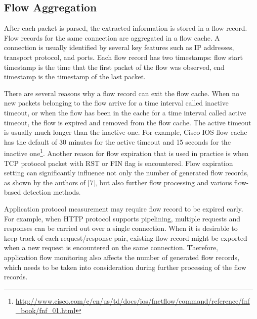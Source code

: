 \subsection{Flow Aggregation}

After each packet is parsed, the extracted information is stored in a flow record. Flow records for the same connection are aggregated in a flow cache. A connection is usually identified by several key features such as IP addresses, transport protocol, and ports. Each flow record has two timestamps: flow start timestamp is the time that the first packet of the flow was observed, end timestamp is the timestamp of the last packet. 

There are several reasons why a flow record can exit the flow cache. When no new packets belonging to the flow arrive for a time interval called inactive timeout, or when the flow has been in the cache for a time interval called active timeout, the flow is expired and removed from the flow cache. The active timeout is usually much longer than the inactive one. For example, Cisco IOS flow cache has the default of 30 minutes for the active timeout and 15 seconds for the inactive one\footnote{\url{http://www.cisco.com/c/en/us/td/docs/ios/fnetflow/command/reference/fnf\_book/fnf\_01.html}}. Another reason for flow expiration that is used in practice is when TCP protocol packet with RST or FIN flag is encountered. Flow expiration setting can significantly influence not only the  number of generated flow records, as shown by the authors of [7], but also further flow processing and various flow-based detection methods.

Application protocol measurement may require flow record to be expired early. For example, when HTTP protocol supports pipelining, multiple requests and responses can be carried out over a single connection. When it is desirable to keep track of each request/response pair, existing flow record might be exported when a new request is encountered on the same connection. Therefore, application flow monitoring  also affects the number of generated flow records, which needs to be taken into consideration during further processing of the flow records.


